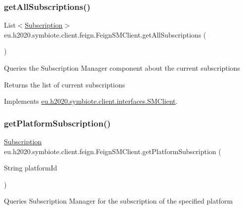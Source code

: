 \subsubsection{\texorpdfstring{get\+All\+Subscriptions()}{getAllSubscriptions()}}
{\footnotesize\ttfamily List$<$\hyperlink{classeu_1_1h2020_1_1symbiote_1_1cloud_1_1model_1_1internal_1_1Subscription}{Subscription}$>$ eu.\+h2020.\+symbiote.\+client.\+feign.\+Feign\+S\+M\+Client.\+get\+All\+Subscriptions (\begin{DoxyParamCaption}{ }\end{DoxyParamCaption})}

Queries the Subscription Manager component about the current subscriptions

\begin{DoxyReturn}{Returns}
the list of current subscriptions 
\end{DoxyReturn}


Implements \hyperlink{interfaceeu_1_1h2020_1_1symbiote_1_1client_1_1interfaces_1_1SMClient_a02686f9fac26754442f62d37b2027c82}{eu.\+h2020.\+symbiote.\+client.\+interfaces.\+S\+M\+Client}.

\mbox{\label{classeu_1_1h2020_1_1symbiote_1_1client_1_1feign_1_1FeignSMClient_a6d8bf2b5d12dcd5db1239f376cd93365}} 
\subsubsection{\texorpdfstring{get\+Platform\+Subscription()}{getPlatformSubscription()}}
{\footnotesize\ttfamily \hyperlink{classeu_1_1h2020_1_1symbiote_1_1cloud_1_1model_1_1internal_1_1Subscription}{Subscription} eu.\+h2020.\+symbiote.\+client.\+feign.\+Feign\+S\+M\+Client.\+get\+Platform\+Subscription (\begin{DoxyParamCaption}\item[{String}]{platform\+Id }\end{DoxyParamCaption})}

Queries Subscription Manager for the subscription of the specified platform


